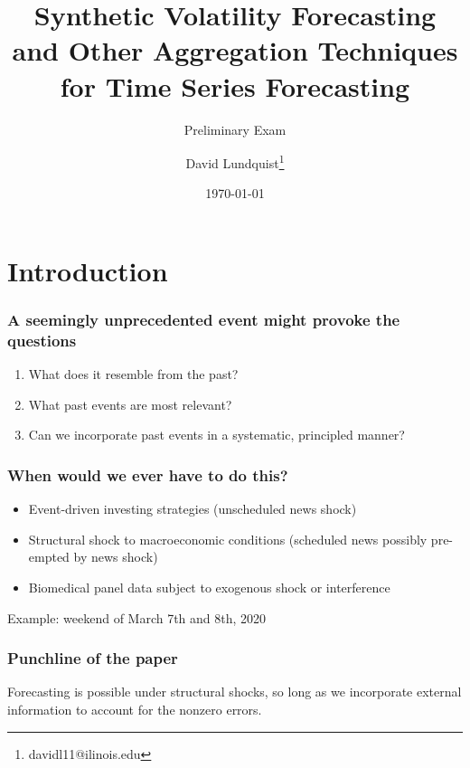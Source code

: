 \documentclass{beamer}
\title{Synthetic Volatility Forecasting and Other Aggregation Techniques for Time Series Forecasting}
\subtitle{Preliminary Exam}
\author{David Lundquist\thanks{davidl11@ilinois.edu}}
\date{\today}
\begin{document}
\begin{frame}
\titlepage
\end{frame}

\section{Introduction}

\begin{frame}
\frametitle{A seemingly unprecedented event might provoke the questions}
\begin{enumerate}
    \item What does it resemble from the past?
    \item What past events are most relevant?
    \item Can we incorporate past events in a systematic, principled manner?
\end{enumerate}
\end{frame}

\begin{frame}
    \frametitle{When would we ever have to do this?}

    \begin{itemize}
        \item Event-driven investing strategies (unscheduled news shock)
        \item Structural shock to macroeconomic conditions (scheduled news possibly pre-empted by news shock)
        \item Biomedical panel data subject to exogenous shock or interference
    \end{itemize}

Example: weekend of March 7th and 8th, 2020

\end{frame}

\begin{frame}
\frametitle{Punchline of the paper}

Forecasting is possible under structural shocks, so long as we incorporate external information to account for the nonzero errors.

\end{frame}
\end{document}
